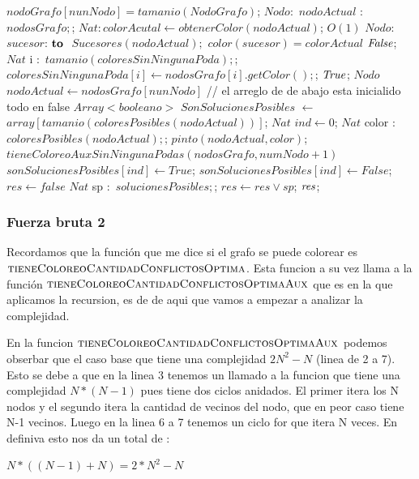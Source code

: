 \begin{codebox}
	\li {}
	\li \If $nodoGrafo  [ nunNodo ] = tamanio(NodoGrafo)$; 
			\Then 
	\li			\For $Nodo:$ $nodoActual$ $:$ \To $ nodosGrafo; $; \Comment{} \Do
	\li				$Nat: colorAcutal \leftarrow obtenerColor(nodoActual)$; \hfill{$O(1)$}	
	\li				\For $Nodo:$ $sucesor $:$ \To $ $Sucesores(nodoActual); $\Do
	\li					\If $ color(sucesor) = colorActual$ 
	\li						\Then \Return $\id{False}$;
						\End
					\End
	\li
				\End
				\li	\For $Nat$ i $:$ \To $ tamanio(coloresSinNingunaPoda); $;  \Do 
				\li			$ coloresSinNingunaPoda[i] \leftarrow nodosGrafo[i].getColor();$;	
					\End				
	\li		\Return $\id{True}$; 
		\End 	 
	\li $Nodo$ $nodoActual \leftarrow nodosGrafo[nunNodo]$
	\li // el arreglo de de abajo esta inicialido todo en false
	\li $Array<booleano>$ $SonSolucionesPosibles$ $\leftarrow$ $array[tamanio(coloresPosibles(nodoActual))]$;	
	\li $Nat $ $ind \leftarrow 0$;
	\li	\For $Nat$ color $:$ \To $ coloresPosibles(nodoActual); $; \Comment{} \Do 
	\li			$ pinto(nodoActual, color)$;	
	\li 		{}
	\li			\If $ tieneColoreoAuxSinNingunaPodas(nodosGrafo, numNodo+1)$ 
	\li				\Then	$sonSolucionesPosibles[ind] \leftarrow True$;
	\li				\Else 	$sonSolucionesPosibles[ind] \leftarrow False$;		
				\End
		\End
	\li $res \leftarrow false$	
	\li \For $Nat$ sp $:$ \To $ solucionesPosibles; $; \Comment{} \Do
	\li		$res \leftarrow res \lor sp $;	
		\End	
	\li \Return $\id{res}$;	
\end{codebox}

\subsubsection{Fuerza bruta 2} 


Recordamos que la función que me dice si el grafo se puede colorear es $\textnormal{\scshape tieneColoreoCantidadConflictosOptima}$. Esta funcion a su vez llama a la función  $\textnormal{\scshape tieneColoreoCantidadConflictosOptimaAux}$ que es en la que aplicamos la recursion, es de de aqui que vamos a empezar a analizar la complejidad. \newline 

En la funcion $\textnormal{\scshape tieneColoreoCantidadConflictosOptimaAux}$ podemos obserbar que el caso base que tiene una complejidad $2N^2 -N$ (linea de 2 a 7). Esto se debe a que en la linea 3 tenemos un llamado a la funcion  que tiene una complejidad  $N*(N-1)$ pues tiene dos ciclos anidados. El primer itera los N nodos y el segundo itera la cantidad de vecinos del nodo, que en peor caso tiene N-1 vecinos. Luego en la linea 6 a 7 tenemos un ciclo for que itera N veces. En definiva esto nos da un total de :  
\begin{center}  $ N*((N-1)+N)= 2*N^2 - N $\end{center}


